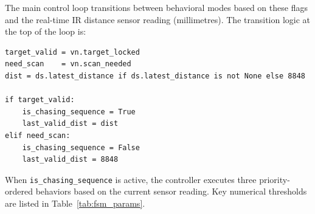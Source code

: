 The main control loop transitions between behavioral modes based on these flags and the real-time IR distance sensor reading (millimetres). The transition logic at the top of the loop is:

\begin{verbatim}
target_valid = vn.target_locked
need_scan    = vn.scan_needed
dist = ds.latest_distance if ds.latest_distance is not None else 8848

if target_valid:
    is_chasing_sequence = True
    last_valid_dist = dist
elif need_scan:
    is_chasing_sequence = False
    last_valid_dist = 8848
\end{verbatim}

When \texttt{is\_chasing\_sequence} is active, the controller executes three priority-ordered behaviors based on the current sensor reading. Key numerical thresholds are listed in Table~\ref{tab:fsm_params}.

